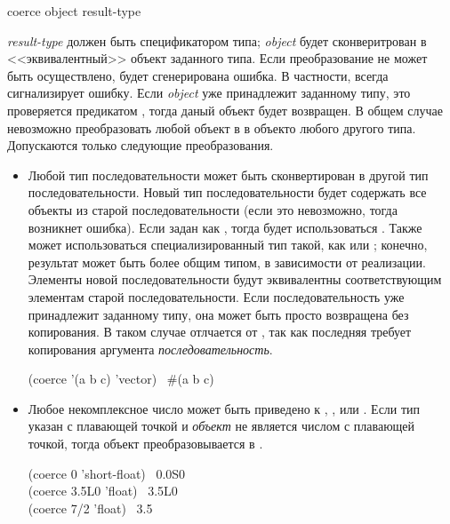 \begin{defun}[Function]
coerce object result-type

\emph{result-type} должен быть спецификатором типа; \emph{object} будет
сконверитрован в <<эквивалентный>> объект заданного типа.
Если преобразование не может быть осуществлено, будет сгенерирована ошибка.
В частности,  всегда сигнализирует ошибку.
Если \emph{object} уже принадлежит заданному типу, это проверяется предикатом
, тогда даный объект будет возвращен.
В общем случае невозможно преобразовать любой объект в в объекто любого другого
типа. Допускаются только следующие преобразования.
\begin{itemize}

\item
Любой тип последовательности может быть сконвертирован в другой тип
последовательности. Новый тип последовательности будет содержать все
 объекты из старой последовательности (если это невозможно, тогда возникнет
ошибка). Если  задан как , тогда будет использоваться
. Также может использоваться специализированный тип такой, как  или ; конечно, результат может быть более общим типом, в
зависимости от реализации.
Элементы новой последовательности будут эквивалентны  соответствующим
элементам старой последовательности.
Если последовательность уже принадлежит заданному типу, она может быть просто
возвращена без копирования. В таком случае  отлчается от , так как последняя требует
копирования аргумента \emph{последовательность}.

\begin{lisp}
(coerce '(a b c) 'vector) \EV\ \#(a b c)
\end{lisp}

\end{itemize}

\begin{itemize}
\item
Любое некомплексное число может быть приведено к ,
,  или . Если тип указан с
плавающей точкой и \emph{объект} не является числом с плавающей точкой, тогда
объект преобразовывается в .

\begin{lisp}
(coerce 0 'short-float) \EV\ 0.0S0 \\
(coerce 3.5L0 'float) \EV\ 3.5L0 \\
(coerce 7/2 'float) \EV\ 3.5
\end{lisp}


\end{itemize}
\end{defun}
